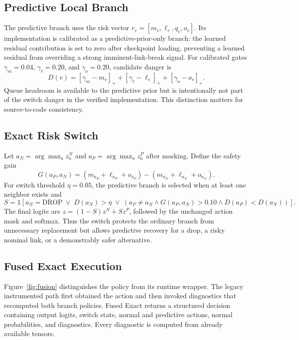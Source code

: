 \documentclass[drones,article,submit,moreauthors]{Definitions/mdpi}
\newcommand{\drop}{\mathrm{DROP}}
\newcommand{\VerifyEdit}[1]{\textcolor{ReviewBlue}{#1}}
\begin{document}
\subsection{Predictive Local Branch}

The predictive branch uses the risk vector $r_v=[m_v,\ell_v,q_v,o_v]$. Its implementation is calibrated as a predictive-prior-only branch: the learned residual contribution is set to zero after checkpoint loading, preventing a learned residual from overriding a strong imminent-link-break signal. For calibrated gates \VerifyEdit{$\gamma_m=0.04$, $\gamma_\ell=0.20$, and $\gamma_o=0.20$}, candidate danger is
\begin{equation}
D(v)=[\gamma_m-m_v]_+ + [\gamma_\ell-\ell_v]_+ + [\gamma_o-o_v]_+.
\label{eq:danger}
\end{equation}
Queue headroom is available to the predictive prior but is intentionally not part of the switch danger in the verified implementation. This distinction matters for source-to-code consistency.

\subsection{Exact Risk Switch}

Let $a_N=\arg\max_a z^N_a$ and $a_P=\arg\max_a z^P_a$ after masking. Define the safety gain
\begin{equation}
G(a_P,a_N)=(m_{a_P}+\ell_{a_P}+o_{a_P})-(m_{a_N}+\ell_{a_N}+o_{a_N}).
\end{equation}
For switch threshold \VerifyEdit{$\eta=0.05$}, the predictive branch is selected when at least one neighbor exists and
\begin{equation}
S=\mathbb{1}\left[a_N=\drop\;\lor\;D(a_N)>\eta\;\lor\;\left(a_P\neq a_N\land G(a_P,a_N)>0.10\land D(a_P)<D(a_N)\right)\right].
\label{eq:switch}
\end{equation}
The final logits are $z=(1-S)z^N+Sz^P$, followed by the unchanged action mask and softmax. Thus the switch protects the ordinary branch from unnecessary replacement but allows predictive recovery for a drop, a risky nominal link, or a demonstrably safer alternative.

\subsection{Fused Exact Execution}

Figure~\ref{fig:fusion} distinguishes the policy from its runtime wrapper. The legacy instrumented path first obtained the action and then invoked diagnostics that recomputed both branch policies. Fused Exact returns a structured decision containing output logits, switch state, normal and predictive actions, normal probabilities, and diagnostics. Every diagnostic is computed from already available tensors.
\end{document}
